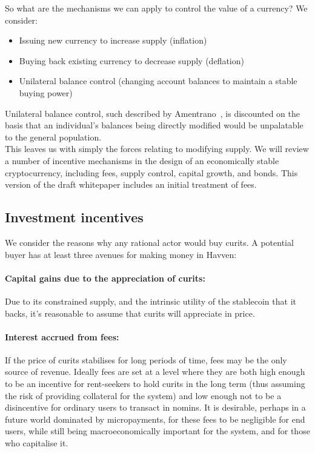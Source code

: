 \noindent So what are the mechanisms we can apply to control the value of a currency? We consider:

\begin{itemize}
    \item Issuing new currency to increase supply (inflation)
    \item Buying back existing currency to decrease supply (deflation)
    \item Unilateral balance control (changing account balances to maintain a stable buying power)
\end{itemize}

\noindent Unilateral balance control, such described by Amentrano~\cite{ametrano2016hayek}, is discounted on the basis that an individual's balances being directly modified would be unpalatable to the general population. \\

\noindent This leaves us with simply the forces relating to modifying supply. We will review a number of incentive mechanisms in the design of an economically stable cryptocurrency, including fees, supply control, capital growth, and bonds. This version of the draft whitepaper includes an initial treatment of fees.

\subsection{Investment incentives}

We consider the reasons why any rational actor would buy curits. A potential buyer has at least three avenues for making money in Havven:

\paragraph{Capital gains due to the appreciation of curits:}
Due to its constrained supply, and the intrinsic utility of the stablecoin that it backs, it's reasonable to assume that
curits will appreciate in price.

\paragraph{Interest accrued from fees:}
If the price of curits stabilises for long periods of time, fees may be the only source of revenue. Ideally fees are set at a level where they are both high enough to be an incentive for rent-seekers to hold curits in the long term (thus assuming the risk of providing collateral for the system) and low enough not to be a disincentive for ordinary users to transact in nomins.
It is desirable, perhaps in a future world dominated by micropayments, for these fees to be negligible for end users, while still being macroeconomically important for the system, and for those who capitalise it.


